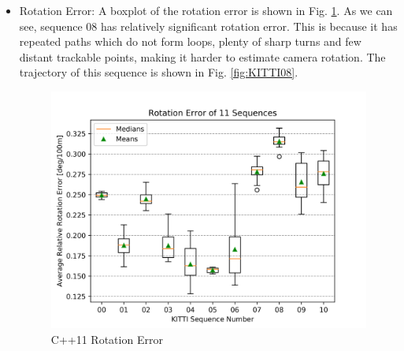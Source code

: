 \documentclass[letterpaper, 10 pt, conference]{IEEEtran}
\begin{document}
\begin{itemize}
    \item Rotation Error: \newline
    A boxplot of the rotation error is shown in Fig. \ref{fig:CRot}. As we
    can see, sequence 08 has relatively significant rotation error. This is
    because it has repeated paths which do not form loops, plenty of sharp turns
    and few distant trackable points, making it harder to estimate camera
    rotation. The trajectory of this sequence is shown in Fig.
    \ref{fig:KITTI08}. 
    
    \begin{figure}[htbp]
    \centerline{\includegraphics[scale=0.59]
    {images/Evaluation/C++/rot_error.png}}
    \caption{C++11 Rotation Error}
    \label{fig:CRot}
    \end{figure}
    

\end{itemize}
\end{document}
